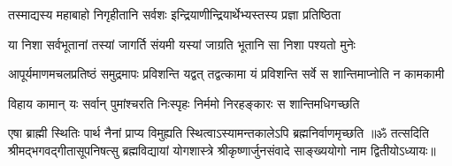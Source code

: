 \twolineshloka
{तस्माद्यस्य महाबाहो निगृहीतानि सर्वशः}
{इन्द्रियाणीन्द्रियार्थेभ्यस्तस्य प्रज्ञा प्रतिष्ठिता}%

\twolineshloka
{या निशा सर्वभूतानां तस्यां जागर्ति संयमी}
{यस्यां जाग्रति भूतानि सा निशा पश्यतो मुनेः}%

\fourlineindentedshloka
{आपूर्यमाणमचलप्रतिष्ठं}
{समुद्रमापः प्रविशन्ति यद्वत्}
{तद्वत्कामा यं प्रविशन्ति सर्वे}
{स शान्तिमाप्नोति न कामकामी}%

\twolineshloka
{विहाय कामान् यः  सर्वान् पुमांश्चरति निःस्पृहः}
{निर्ममो निरहङ्कारः स शान्तिमधिगच्छति}%

\twolineshloka
{एषा ब्राह्मी स्थितिः पार्थ नैनां प्राप्य विमुह्यति}
{स्थित्वाऽस्यामन्तकालेऽपि ब्रह्मनिर्वाणमृच्छति}%
{॥ॐ तत्सदिति श्रीमद्भगवद्गीतासूपनिषत्सु ब्रह्मविद्यायां योगशास्त्रे श्रीकृष्णार्जुनसंवादे साङ्ख्ययोगो नाम द्वितीयोऽध्यायः॥}